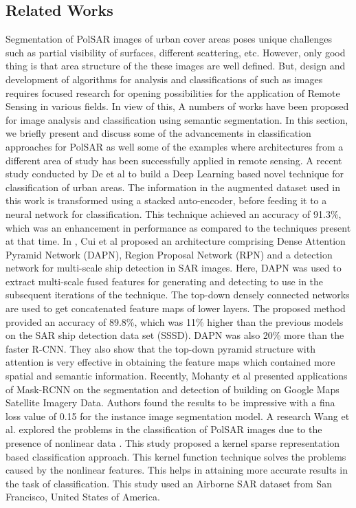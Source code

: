 \documentclass[a4paper,12pt]{spieman}  %
\begin{document}
\begin{spacing}{1}
\section{Related Works}
Segmentation of PolSAR images of urban cover areas poses unique challenges such as partial visibility of surfaces, different scattering, etc. However, only good thing is that area structure of the these images are well defined. But, design and development of algorithms for analysis and classifications of such as images requires focused research for opening possibilities for the application of Remote Sensing in various fields. In view of this, A numbers of works have been proposed for image analysis and classification using semantic segmentation. In this section, we briefly present and discuss some of the advancements in classification approaches for PolSAR as well some of the examples where architectures from a different area of study has been successfully applied in remote sensing.
A recent study conducted by De et al\cite{8068203} to build a Deep Learning based novel technique for classification of urban areas. The information in the augmented dataset used in this work is transformed using a stacked auto-encoder, before feeding it to a neural network for classification. This technique achieved an accuracy of 91.3\%, which was an enhancement in performance as compared to the techniques present at that time. In \cite{8763918}, Cui et al proposed an architecture comprising Dense Attention Pyramid Network (DAPN), Region Proposal Network (RPN) and a detection network for multi-scale ship detection in SAR images. Here, DAPN was used to extract multi-scale fused features for generating and detecting to  use in the subsequent iterations of the technique. The top-down densely connected networks are used to get concatenated feature maps of lower layers. The proposed method provided an accuracy of 89.8\%, which was 11\% higher than the previous models on the SAR ship detection data set (SSSD). DAPN was also 20\% more than the faster R-CNN\cite{ren2015faster}. They also show that the top-down pyramid structure with attention is very effective in obtaining the feature maps which contained more spatial and semantic information.
Recently, Mohanty et al presented applications of Mask-RCNN \cite{mrccnbuildling} on the segmentation and detection of building on Google Maps Satellite Imagery Data. Authors found the results to be impressive with a fina loss value of 0.15 for the instance image segmentation model. A research Wang et al. explored the problems in the classification of PolSAR images due to the presence of nonlinear data \cite{wang2018polarimetric}. This study proposed a kernel sparse representation based classification approach. This kernel function technique solves the problems caused by the nonlinear features. This helps in attaining more accurate results in the task of classification. This study used an Airborne SAR dataset from San Francisco, United States of America.

\end{spacing}
\end{document}
